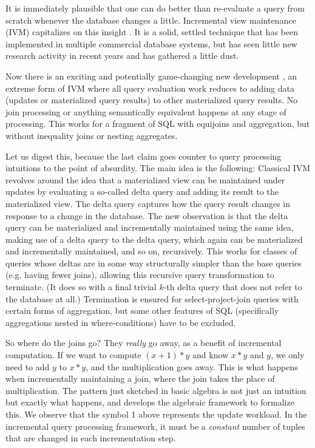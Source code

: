 
It is immediately plausible that one can do better than re-evaluate a query from scratch whenever the database changes a little. Incremental view maintenance (IVM) capitalizes on this insight \cite{DBLP:journals/tods/BunemanC79,DBLP:conf/sigmod/ShmueliI84,DBLP:conf/sigmod/BlakeleyLT86,roussopoulos-tods:91,DBLP:conf/vldb/CeriW91,DBLP:conf/deductive/GuptaKM92,DBLP:conf/sigmod/GuptaMS93,griffin-sigmod:95,yan-vldb:95,colby-sigmod:96,GHJ1996,kotidis-tods:01}. It is a solid, settled technique that has been implemented in multiple commercial database systems, but has seen little new research activity in recent years and has gathered a little dust.

Now there is an exciting and potentially game-changing new development \cite{ahmad-vldb:09, koch-pods:10, kennedy-ahmad-koch-cidr:11}, an extreme form of IVM where all query evaluation work reduces to adding data (updates or materialized query results) to other materialized query results.  No join processing or anything semantically equivalent happens at any stage of processing. This works for a fragment of SQL with equijoins and aggregation, but without inequality joins or nesting aggregates.


Let us digest this, because the last claim goes counter to query processing intuitions to the point of absurdity. The main idea is the following: Classical IVM revolves around the idea that a materialized view can be maintained under updates by evaluating a so-called delta query and adding its result to the materialized view. The delta query captures how the query result changes in response to a change in the database. The new observation is that the delta query can be materialized and incrementally maintained using the same idea, making use of a delta query to the delta query, which again can be materialized and incrementally maintained, and so on, recursively. This works for classes of queries whose deltas are in some way structurally simpler than the base queries (e.g. having fewer joins), allowing this recursive query transformation to terminate. (It does so with a final trivial $k$-th delta query that does not refer to the database at all.) Termination is ensured for select-project-join queries with certain forms of aggregation, but some other features of SQL (specifically aggregations nested in where-conditions) have to be excluded. 

So where do the joins go? They {\em really} go away, as a benefit of incremental computation. If we want to compute $(x+1)*y$ and know $x*y$ and $y$, we only need to add $y$ to $x*y$, and the multiplication goes away. This is what happens when incrementally maintaining a join, where the join takes the place of multiplication. The pattern just sketched in basic algebra is not just an intuition but exactly what happens, and \cite{koch-pods:10} develops the algebraic framework to formalize this. We observe that the symbol 1 above represents the update workload.  In the incremental query processing framework, it must be a {\em constant} number of tuples that are changed in each incrementation step.

